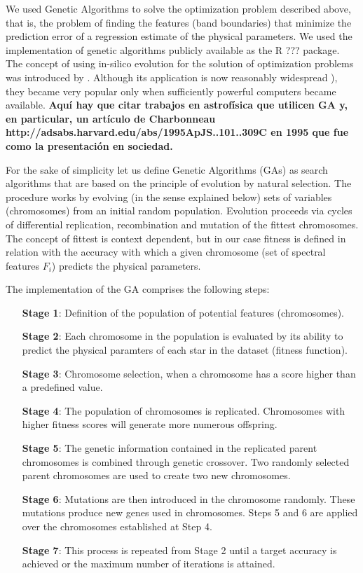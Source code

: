 We used Genetic Algorithms to solve the optimization problem described
above, that is, the problem of finding the features (band boundaries)
that minimize the prediction error of a regression estimate of the
physical parameters. We used the implementation of genetic algorithms
publicly available as the R \citep{R2013} ???  package. The concept of
using in-silico evolution for the solution of optimization problems
was introduced by \cite{holland1975adaptation}. Although its
application is now reasonably widespread \citep[see
e.g. ]{goldberg1989genetic}), they became very popular only when
sufficiently powerful computers became available. {\bf Aquí hay que
citar trabajos en astrofísica que utilicen GA y, en particular, un
artículo de Charbonneau
http://adsabs.harvard.edu/abs/1995ApJS..101..309C en 1995 que fue como
la presentación en sociedad.}

For the sake of simplicity let us define Genetic Algorithms (GAs) as
search algorithms that are based on the principle of evolution by
natural selection. The procedure works by evolving (in the sense
explained below) sets of variables (chromosomes) from an initial
random population. Evolution proceeds via cycles of differential
replication, recombination and mutation of the fittest
chromosomes. The concept of fittest is context dependent, but in our
case fitness is defined in relation with the accuracy with which a
given chromosome (set of spectral features ${F_i}$) predicts the
physical parameters.

The implementation of the GA comprises the following steps:

\begin{itemize}
\item [\textbf{Stage 1}:]{Definition of the population of potential features (chromosomes).}
\item [\textbf{Stage 2}:]{Each chromosome in the population is evaluated by its ability to
predict the physical paramters of each star in the dataset (fitness
function).}
\item [\textbf{Stage 3}:]{Chromosome selection, when a chromosome has 
 a score higher than a predefined value.}
\item [\textbf{Stage 4}:]{The population of chromosomes is replicated. 
 Chromosomes with higher fitness scores will generate more numerous
 offspring.}
\item [\textbf{Stage 5}:]{The genetic information contained in the replicated parent
chromosomes is combined through genetic crossover. Two randomly
selected parent chromosomes are used to create two new chromosomes.}
\item [\textbf{Stage 6}:]{Mutations are then introduced in the chromosome randomly. 
 These mutations produce new genes used in chromosomes.  Steps 5 and 6
 are applied over the chromosomes established at Step 4.}
\item [\textbf{Stage 7}:]{This process is repeated from Stage 2 until 
  a target accuracy is achieved or the maximum number of iterations is
  attained.}
\end{itemize}

